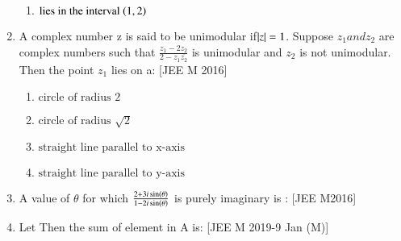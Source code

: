 \documentclass[journal,12pt,twocolumn,article]{IEEEtran}
\theoremstyle{remark}
\begin{document}
\begin{enumerate}[start = 14]
\begin{enumerate}
\item $\text {lies in the interval $\left(1,2\right)$}$

\end{enumerate}

\item A complex number z is said to be unimodular if$\left\vert z\right\vert=1$. Suppose $z_1 and z_2$ are complex numbers such that $\frac{z_1 -2z_2}{2-z_1\overline{z_2}}$ is unimodular and $z_2$ is not unimodular. Then the point $z_1$ lies on a:                                
\hfill{[JEE M 2016]}                               

\begin{enumerate}                                  
                              
\item $\text {circle of radius 2}$
                             
\item $\text {circle of radius $\sqrt2$}$

\item $\text {straight line parallel to x-axis}$

\item $\text {straight line parallel to y-axis}$

\end{enumerate}

\item A value of $\theta$ for which $\frac{2+3i\sin\left(\theta\right)}{1-2i\sin\left(\theta\right)}$ is purely imaginary is :      
\hfill{[JEE M2016]}

\begin{enumerate}
\end{enumerate}                                     

\item Let   Then the sum of element in A is:
\hfill{[JEE M 2019-9 Jan (M)]}
\begin{enumerate}
\end{enumerate}


\end{enumerate}
\end{document}
